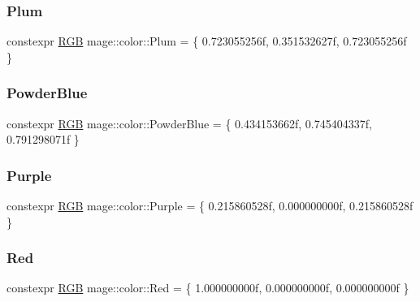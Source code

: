 \hypertarget{namespacemage_1_1color_aa46d4f06d75baccba40c0b04ddb88775}{}\label{namespacemage_1_1color_aa46d4f06d75baccba40c0b04ddb88775} 
\subsubsection{\texorpdfstring{Plum}{Plum}}
{\footnotesize\ttfamily constexpr \hyperlink{structmage_1_1_r_g_b}{R\+GB} mage\+::color\+::\+Plum = \{ 0.\+723055256f, 0.\+351532627f, 0.\+723055256f \}}

\hypertarget{namespacemage_1_1color_aa958d1e0bc2c4f67cdd4e74552d63600}{}\label{namespacemage_1_1color_aa958d1e0bc2c4f67cdd4e74552d63600} 
\subsubsection{\texorpdfstring{Powder\+Blue}{PowderBlue}}
{\footnotesize\ttfamily constexpr \hyperlink{structmage_1_1_r_g_b}{R\+GB} mage\+::color\+::\+Powder\+Blue = \{ 0.\+434153662f, 0.\+745404337f, 0.\+791298071f \}}

\hypertarget{namespacemage_1_1color_af70cf4f9a882428e08cb958fe75a5a30}{}\label{namespacemage_1_1color_af70cf4f9a882428e08cb958fe75a5a30} 
\subsubsection{\texorpdfstring{Purple}{Purple}}
{\footnotesize\ttfamily constexpr \hyperlink{structmage_1_1_r_g_b}{R\+GB} mage\+::color\+::\+Purple = \{ 0.\+215860528f, 0.\+000000000f, 0.\+215860528f \}}

\hypertarget{namespacemage_1_1color_a244419fcb8dc2b947e0c50af5fa4fb52}{}\label{namespacemage_1_1color_a244419fcb8dc2b947e0c50af5fa4fb52} 
\subsubsection{\texorpdfstring{Red}{Red}}
{\footnotesize\ttfamily constexpr \hyperlink{structmage_1_1_r_g_b}{R\+GB} mage\+::color\+::\+Red = \{ 1.\+000000000f, 0.\+000000000f, 0.\+000000000f \}}

